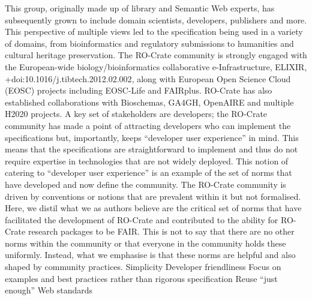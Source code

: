 {}This group, originally made up of library and Semantic Web experts, has subsequently grown to include domain scientists, developers, publishers and more. This perspective of multiple views led to the specification being used in a variety of domains, from bioinformatics and regulatory submissions to humanities and cultural heritage preservation. \markdownRendererInterblockSeparator
{}The RO-Crate community is strongly engaged with the European-wide biology/bioinformatics collaborative e-Infrastructure, ELIXIR, +{}{}{doi:10.1016/j.tibtech.2012.02.002}, along with European Open Science Cloud (EOSC) projects including EOSC-Life and FAIRplus. RO-Crate has also established collaborations with Bioschemas, GA4GH, OpenAIRE and multiple H2020 projects.\markdownRendererInterblockSeparator
{}A key set of stakeholders are developers; the RO-Crate community has made a point of attracting developers who can implement the specifications but, importantly, keeps “developer user experience” in mind. This means that the specifications are straightforward to implement and thus do not require expertise in technologies that are not widely deployed. \markdownRendererInterblockSeparator
{}This notion of catering to “developer user experience” is an example of the set of norms that have developed and now define the community. \markdownRendererInterblockSeparator
{}\markdownRendererInterblockSeparator
{}The RO-Crate community is driven by conventions or notions that are prevalent within it but not formalised. Here, we distil what we as authors believe are the critical set of norms that have facilitated the development of RO-Crate and contributed to the ability for RO-Crate research packages to be FAIR. This is not to say that there are no other norms within the community or that everyone in the community holds these uniformly. Instead, what we emphasise is that these norms are helpful and also shaped by community practices. \markdownRendererInterblockSeparator
{}\markdownRendererOlBeginTight
{}Simplicity\markdownRendererOlItemEnd 
{}Developer friendliness\markdownRendererOlItemEnd 
{}Focus on examples and best practices rather than rigorous specification\markdownRendererOlItemEnd 
{}Reuse “just enough” Web standards\markdownRendererOlItemEnd 
\markdownRendererOlEndTight \markdownRendererInterblockSeparator
